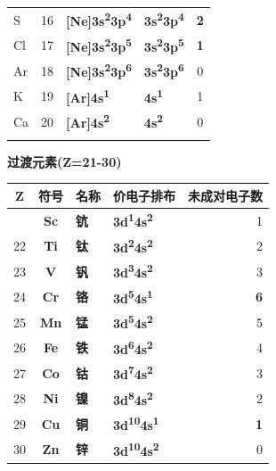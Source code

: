 {\begin{longtable}[]{@{}lcllc@{}}
S & 16 & \textbf{{[}Ne{]}3s\textsuperscript{2}3p\textsuperscript{4}} & \textbf{3s\textsuperscript{2}3p\textsuperscript{4}} & \textbf{2} \\
Cl & 17 & \textbf{{[}Ne{]}3s\textsuperscript{2}3p\textsuperscript{5}} & \textbf{3s\textsuperscript{2}3p\textsuperscript{5}} & \textbf{1} \\
Ar & 18 & \textbf{{[}Ne{]}3s\textsuperscript{2}3p\textsuperscript{6}} & \textbf{3s\textsuperscript{2}3p\textsuperscript{6}} & 0 \\
K & 19 & \textbf{{[}Ar{]}4s\textsuperscript{1}} & \textbf{4s\textsuperscript{1}} & 1 \\
Ca & 20 & \textbf{{[}Ar{]}4s\textsuperscript{2}} & \textbf{4s\textsuperscript{2}} & 0 \\
& & & & \\
\end{longtable}
}

\textbf{过渡元素(Z=21-30)}

{\def\LTcaptype{none} %
\begin{longtable}[]{@{}ccllr@{}}
\toprule\noalign{}
Z & 符号 & 名称 & 价电子排布 & 未成对电子数 \\
\midrule\noalign{}
\endhead
\bottomrule\noalign{}
\endlastfoot
21 & \textbf{Sc} & \textbf{钪} & \textbf{3d\textsuperscript{1}4s\textsuperscript{2}} & 1 \\
22 & \textbf{Ti} & \textbf{钛} & \textbf{3d\textsuperscript{2}4s\textsuperscript{2}} & 2 \\
23 & \textbf{V} & \textbf{钒} & \textbf{3d\textsuperscript{3}4s\textsuperscript{2}} & 3 \\
24 & \textbf{Cr} & \textbf{铬} & \textbf{3d\textsuperscript{5}4s\textsuperscript{1}} & \textbf{6} \\
25 & \textbf{Mn} & \textbf{锰} & \textbf{3d\textsuperscript{5}4s\textsuperscript{2}} & 5 \\
26 & \textbf{Fe} & \textbf{铁} & \textbf{3d\textsuperscript{6}4s\textsuperscript{2}} & 4 \\
27 & \textbf{Co} & \textbf{钴} & \textbf{3d\textsuperscript{7}4s\textsuperscript{2}} & 3 \\
28 & \textbf{Ni} & \textbf{镍} & \textbf{3d\textsuperscript{8}4s\textsuperscript{2}} & 2 \\
29 & \textbf{Cu} & \textbf{铜} & \textbf{3d\textsuperscript{10}4s\textsuperscript{1}} & \textbf{1} \\
30 & \textbf{Zn} & \textbf{锌} & \textbf{3d\textsuperscript{10}4s\textsuperscript{2}} & 0 \\
\end{longtable}
}


